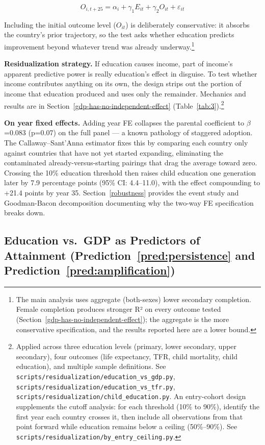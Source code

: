 \documentclass[12pt,letterpaper]{article}
\begin{document}
\[O_{i,t+25} = \alpha_i + \gamma_1 E_{it} + \gamma_2 O_{it} + \varepsilon_{it}\]

Including the initial outcome level ($O_{it}$) is deliberately conservative: it absorbs the country's prior trajectory, so the test asks whether education predicts improvement beyond whatever trend was already underway.\footnote{The main analysis uses aggregate (both-sexes) lower secondary completion. Female completion produces stronger R² on every outcome tested (Section~\ref{gdp-has-no-independent-effect}); the aggregate is the more conservative specification, and the results reported here are a lower bound.}

\textbf{Residualization strategy.} If education causes income, part of
income's apparent predictive power is really education's effect in
disguise. To test whether income contributes anything on its own, the
design strips out the portion of income that education produced and
uses only the remainder. Mechanics and results are in
Section~\ref{gdp-has-no-independent-effect} (Table~\ref{tab:3}).\footnote{Applied
across three education levels (primary, lower secondary, upper
secondary), four outcomes (life expectancy, TFR, child mortality,
child education), and multiple sample definitions. See
\texttt{scripts/residualization/education\_vs\_gdp.py},
\texttt{scripts/residualization/education\_vs\_tfr.py},
\texttt{scripts/residualization/child\_education.py}. An entry-cohort
design supplements the cutoff analysis: for each threshold (10\% to 90\%),
identify the first year each country crosses it, then include all
observations from that point forward while education remains below a
ceiling (50\%--90\%). See \texttt{scripts/residualization/by\_entry\_ceiling.py}.}

\textbf{On year fixed effects.} Adding year FE collapses the parental
coefficient to $\beta$=0.083 (p=0.07) on the full panel --- a known
pathology of staggered adoption. The Callaway--Sant'Anna estimator
fixes this by comparing each country only against countries that have
not yet started expanding, eliminating the contaminated already-versus-starting
pairings that drag the average toward zero. Crossing the 10\% education
threshold then raises child education one generation later by
7.9 percentage points (95\% CI: 4.4--11.0), with the effect compounding
to +21.4 points by year 35. Section~\ref{robustness} provides
the event study and Goodman-Bacon decomposition documenting why the
two-way FE specification breaks down.

\subsection{Education vs.\ GDP as Predictors of Attainment (Prediction~\ref{pred:persistence} and Prediction~\ref{pred:amplification})}\label{education-vs-gdp-as-predictors-of-attainment}
\end{document}
